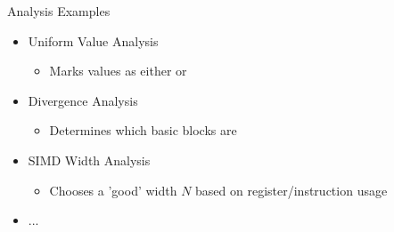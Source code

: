 \begin{frame}{Analysis Examples}

\begin{itemize}
    \item Uniform Value Analysis
    \begin{itemize}
        \item Marks values as either  or 
    \end{itemize}

    \item Divergence Analysis
    \begin{itemize}
        \item Determines which basic blocks are 
    \end{itemize}
    
    \item SIMD Width Analysis
    \begin{itemize}
        \item Chooses a 'good' width $N$ based on register/instruction usage
    \end{itemize}
    
    \item ...
\end{itemize}

\end{frame}


